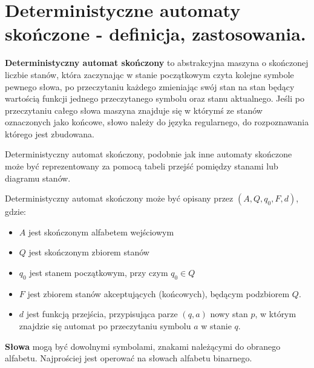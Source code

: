 \documentclass[../main.tex]{subfiles}
\begin{document}
\section{Deterministyczne automaty skończone - definicja, zastosowania.}

\textbf{Deterministyczny automat skończony} to abstrakcyjna maszyna o skończonej liczbie stanów, która
zaczynając w stanie początkowym czyta kolejne symbole pewnego słowa, po przeczytaniu każdego
zmieniając swój stan na stan będący wartością funkcji jednego przeczytanego symbolu oraz stanu
aktualnego. Jeśli po przeczytaniu całego słowa maszyna znajduje się w którymś ze stanów oznaczonych
jako końcowe, słowo należy do języka regularnego, do rozpoznawania którego jest zbudowana.

Deterministyczny automat skończony, podobnie jak inne automaty skończone może być reprezentowany za pomocą tabeli przejść pomiędzy stanami lub diagramu stanów. 

Deterministyczny automat skończony może być opisany przez $(A,Q,q_{0},F,d)$, gdzie:
\begin{itemize}
    \item $A$ jest skończonym alfabetem wejściowym
    \item $Q$ jest skończonym zbiorem stanów
    \item $q_{0}$ jest stanem początkowym, przy czym $q_{0} \in Q$
    \item $F$ jest zbiorem stanów akceptujących (końcowych), będącym podzbiorem $Q$.
    \item $d$ jest funkcją przejścia, przypisująca parze $(q,a)$ nowy stan $p$, w którym znajdzie się automat po przeczytaniu symbolu $a$ w stanie $q$.
\end{itemize}

\textbf{Słowa} mogą być dowolnymi symbolami, znakami należącymi do obranego alfabetu. Najprościej jest operować na słowach alfabetu binarnego.
\end{document}
